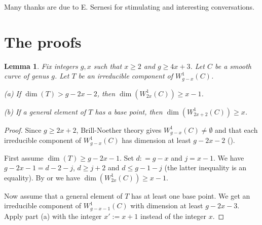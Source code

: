\documentclass{amsart}
\theoremstyle{plain}
\newtheorem{lemma}{Lemma}
\theoremstyle{definition}
\begin{document}
Many thanks are due to E. Sernesi for stimulating and interesting conversations.


\section{The proofs}\label{Sp}

\begin{lemma}\label{s1}
Fix integers $g, x$ such that $x\ge 2$ and $g\ge 4x+3$. Let $C$ be a smooth curve of genus $g$. Let $T$ be an irreducible component of $W^1_{g-x}({C})$.

\quad (a) If $\dim (T) > g-2x-2$, then $\dim (W^1_{2x}({C})) \ge x-1$.


\quad (b) If a general element of $T$ has a base point, then $\dim (W^1_{2x+2}({C})) \ge x$.
\end{lemma}

\begin{proof}
Since $g \ge 2x+2$, Brill-Noether theory gives $W^1_{g-x}({C})\ne \emptyset$ and that each irreducible component of $W^1_{g-x}({C})$ has dimension at least $g-2x-2$ (\cite[Ch. IV]{acgh}).

First assume $\dim (T)\ge g-2x-1$. Set $d: =g-x$ and $j=x-1$. We have $g-2x-1 =d-2-j$, $d \ge j+2$ and $d \le g-1-j$ (the
latter inequality is an equality). By \cite{m} or \cite[Theorem 1]{h} we have $\dim (W^1_{2x}({C})) \ge x-1$. 

Now assume that a general element of $T$ has at least one base point. We get an irreducible component of $W^1_{g-x-1}({C})$ with dimension at least $g-2x-3$. Apply part (a) with the integer $x':= x+1$ instead of the integer $x$.
\end{proof}
\end{document}
